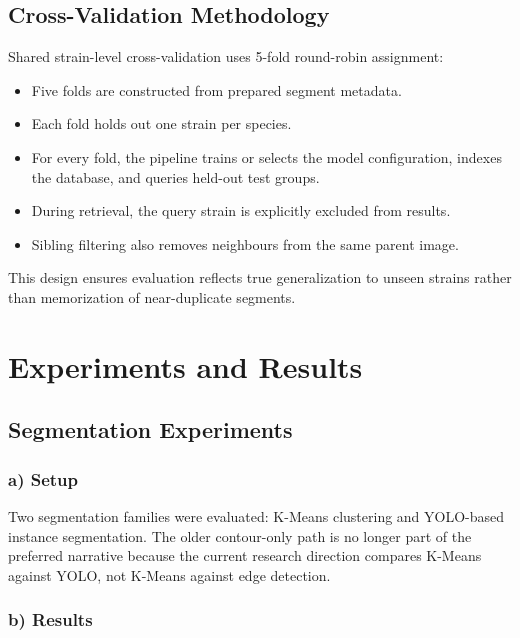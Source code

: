 \subsection{Cross-Validation Methodology}\label{cross-validation-methodology}

Shared strain-level cross-validation uses 5-fold round-robin assignment:

\begin{itemize}
  \item Five folds are constructed from prepared segment metadata.
  \item Each fold holds out one strain per species.
  \item For every fold, the pipeline trains or selects the model configuration, indexes the database, and queries held-out test groups.
  \item During retrieval, the query strain is explicitly excluded from results.
  \item Sibling filtering also removes neighbours from the same parent image.
\end{itemize}

This design ensures evaluation reflects true generalization to unseen strains rather than memorization of near-duplicate segments.

\section{Experiments and Results}\label{experiments-and-results}

\subsection{Segmentation Experiments}\label{segmentation-experiments}

\subsubsection{a) Setup}

Two segmentation families were evaluated: K-Means clustering and YOLO-based instance segmentation. The older contour-only path is no longer part of the preferred narrative because the current research direction compares K-Means against YOLO, not K-Means against edge detection.

\subsubsection{b) Results}

